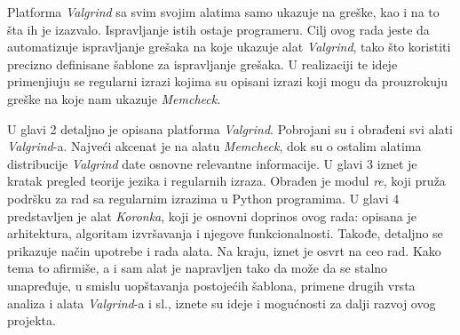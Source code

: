 \documentclass[12pt,oneside]{memoir}
\theoremstyle{plain}
\theoremstyle{definition}
\begin{document}
Platforma \textit{Valgrind} sa svim svojim alatima samo ukazuje na greške, kao i na to šta ih je izazvalo. Ispravljanje istih ostaje programeru. Cilj ovog rada jeste da automatizuje ispravljanje grešaka na koje ukazuje alat \textit{Valgrind}, tako što koristiti precizno definisane šablone za ispravljanje grešaka. U realizaciji te ideje primenjiuju se regularni izrazi kojima su opisani izrazi koji mogu da prouzrokuju greške na koje nam ukazuje \textit{Memcheck}.

U glavi 2 detaljno je opisana platforma \textit{Valgrind}. Pobrojani su i obrađeni svi alati \textit{Valgrind}-a. Najveći akcenat je na alatu \textit{Memcheck}, dok su o ostalim alatima distribucije \textit{Valgrind} date osnovne relevantne informacije. U glavi 3 iznet je kratak pregled teorije jezika i regularnih izraza. Obrađen je modul \textit{re}, koji pruža podršku za rad sa regularnim izrazima u Python programima. U glavi 4 predstavljen je alat \textit{Koronka}, koji je osnovni doprinos ovog rada: opisana je arhitektura, algoritam izvršavanja i njegove funkcionalnosti. Takođe, detaljno se prikazuje način upotrebe i rada alata. Na kraju, iznet je osvrt na ceo rad. Kako tema to afirmiše, a i sam alat je napravljen tako da može da se stalno unapređuje, u smislu uopštavanja postojećih šablona, primene drugih vrsta analiza i alata \textit{Valgrind}-a i sl., iznete su ideje i mogućnosti za dalji razvoj ovog projekta.
\end{document}
